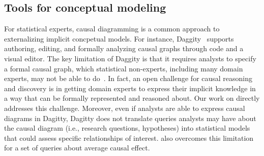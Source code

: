 
\subsection{Tools for conceptual modeling}
For statistical experts, causal diagramming is a common approach to
externalizing implicit concpetual models. For instance,
Daggity~\cite{textor2011dagitty} supports authoring, editing, and formally
analyzing causal graphs through code and a visual editor. The key limitation of
Daggity is that it requires analysts to specify a formal causal graph, which
statistical non-experts, including many domain experts, may not be able to
do~\cite{suzuki2020causal,suzuki2018mechanisms,velentgas2013developing}. In
fact, an open challenge for causal reasoning and discovery is in getting domain
experts to express their implicit knowledge in a way that can be formally
represented and reasoned about. Our work on \tisane directly addresses this
challenge. Moreover, even if analysts are able to express causal diagrams in
Dagitty, Dagitty does not translate queries analysts may have about the causal
diagram (i.e., research questions, hypotheses) into statistical models that
could assess specific relationships of interest. \tisane also overcomes this
limitation for a set of queries about average causal effect. 


\def\edibble{\texttt{edibble}\xspace}
